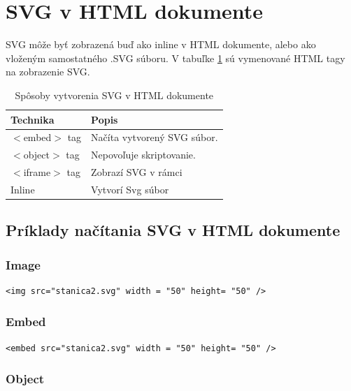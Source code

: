  
 \section{\acs*{SVG} v HTML dokumente}


SVG môže byť zobrazená buď ako inline v HTML dokumente, alebo ako vloženým samostatného .SVG súboru.
V tabuľke \ref{vytvorenie:SVG} sú vymenované HTML tagy na zobrazenie SVG. 



\begin{table}[hp]
	\begin{center}
		\begin{tabular}{|l|l|}
			\hline \textbf{Technika} & \textbf{Popis} \\ 
			\hline $<$embed$>$ tag & Načíta vytvorený SVG súbor.  \\ 
			\hline $<$object$>$ tag & Nepovoľuje skriptovanie.  \\ 
			\hline $<$iframe$>$ tag & Zobrazí SVG v rámci  \\ 
			\hline Inline & Vytvorí Svg súbor \\ 
			\hline
		\end{tabular} 
	\end{center}
	\caption{Spôsoby vytvorenia SVG v HTML dokumente}
	\label{vytvorenie:SVG}
\end{table}

\subsection{Príklady načítania SVG v HTML dokumente}

	\subsubsection{Image}
	\begin{lstlisting}
<img src="stanica2.svg" width = "50" height= "50" />
	\end{lstlisting}
	
	\subsubsection{Embed}
	\begin{lstlisting}
<embed src="stanica2.svg" width = "50" height= "50" />
	\end{lstlisting}
	
	
\subsubsection{Object}

